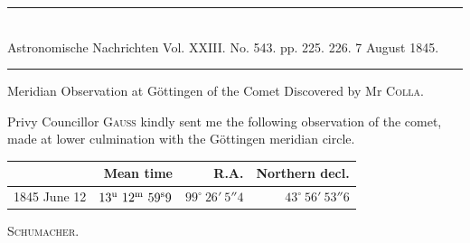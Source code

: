\clearpage
{}
\hypertarget{native-476-middle}{}
\begin{center}
\rule{0.55\linewidth}{0.4pt}\\[2pt]
Astronomische Nachrichten Vol. XXIII. No. 543. pp. 225. 226. 7 August 1845.\\[2pt]
\rule{0.55\linewidth}{0.4pt}
\end{center}

\begin{center}Meridian Observation at Göttingen of the Comet Discovered by Mr \textsc{Colla}.\end{center}

Privy Councillor \textsc{Gauss} kindly sent me the following observation of the comet, made at lower culmination with the Göttingen meridian circle.

\begin{center}
\setlength{\tabcolsep}{5pt}
\begin{tabular}{l|r|r|r}
 & Mean time & R.A. & Northern decl. \\
\hline
1845 June 12 & $13^{\rm u}\ 12^{\rm m}\ 59^{\rm s}9$ & $99^\circ\ 26'\ 5''4$ & $43^\circ\ 56'\ 53''6$ \\
\end{tabular}
\end{center}
\begin{flushright}\textsc{Schumacher}.\end{flushright}

